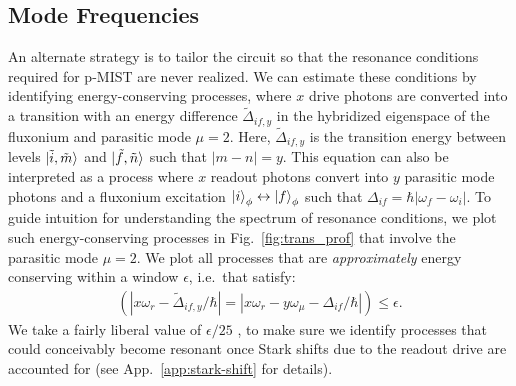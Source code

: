 \documentclass[%
reprint,
superscriptaddress,
 amsmath,amssymb,
 aps,
 prx,
longbibliography,
floatfix,
]{revtex4-2}
\begin{document}
\subsection{Mode Frequencies}\label{mode-frequencies}

An alternate strategy is to tailor the circuit so that the resonance conditions required for p-MIST are never realized. We can estimate these conditions by identifying energy-conserving processes, where $x$ drive photons are converted into a transition with an energy difference $\tilde{\Delta}_{if,y}$ in the hybridized eigenspace of the fluxonium and parasitic mode $\mu=2$. Here, $\tilde{\Delta}_{if,y}$ is the transition energy between levels $\ket{\tilde{i},\tilde{m}}$ and $\ket{\tilde{f},\tilde{n}}$ such that $|m-n|=y$. 
This equation can also be interpreted as a process where $x$ readout photons convert into $y$ parasitic mode photons and a fluxonium excitation $\ket{i}_\phi \leftrightarrow \ket{f}_\phi$ such that $\Delta_{if}=\hbar|\omega_f-\omega_i|$. To guide intuition for understanding the spectrum of resonance conditions, we plot such energy-conserving processes in Fig.~\ref{fig:trans_prof} that involve the parasitic mode $\mu=2$.
We plot all processes that are {\it approximately} energy conserving within a window $\epsilon$, i.e.~that satisfy:
\begin{align}
\left(
    |x\omega_r-\tilde{\Delta}_{if,y}/\hbar| = 
|x\omega_r-y\omega_\mu-\Delta_{if}/\hbar| \right) \le \epsilon.
\label{eq:En_cons}
\end{align}
We take a fairly liberal value of $\epsilon / 25$ , to make sure we identify processes that could conceivably become resonant once Stark shifts due to the readout drive are accounted for (see App.~\ref{app:stark-shift} for details).
\end{document}
